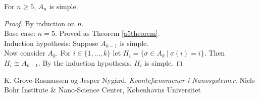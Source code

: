 \documentclass[a4paper]{article}
\begin{document}
\begin{theorem}
For $n \ge 5$, $A_n$ is simple.
\end{theorem}
\begin{proof}
By induction on $n$. \\
Base case: $n = 5$. Proved as Theorem \ref{a5theorem}. \\
Induction hypothesis: Suppose $A_{k-1}$ is simple. \\
Now consider $A_k$. For $i \in \{1, ..., k\}$ let $H_i = \{\sigma \in A_k\ |\ \sigma(i) = i\}$. Then $H_i \cong A_{k-1}$. By the induction hypothesis, $H_i$ is simple.
\end{proof}

\begin{thebibliography}{9}
  K. Grove-Rasmussen og Jesper Nygård,
  \emph{Kvantefænomener i Nanosystemer}.
  Niels Bohr Institute \& Nano-Science Center, Københavns Universitet

\end{thebibliography}
\end{document}
